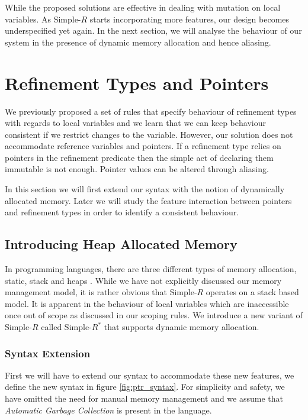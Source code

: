 \documentclass[a4paper,12pt]{report}
\begin{document}
\par
While the proposed solutions are effective in dealing with mutation on local 
variables. As Simple-$R$ starts incorporating more features, our design becomes 
underspecified yet again. In the next section, we will analyse 
the behaviour of our system in the presence of dynamic memory allocation 
and hence aliasing.

\section{Refinement Types and Pointers}
We previously proposed a set of rules that specify behaviour of refinement 
types with regards to local variables and we learn that we can keep behaviour 
consistent if we restrict changes to the variable. However, our solution does 
not accommodate reference variables and pointers. If a refinement type 
relies on pointers in the refinement predicate then the simple act of declaring 
them immutable is not enough. Pointer values can be altered through aliasing. 

\par
In this section we will first extend our syntax with the notion of dynamically 
allocated memory. Later we will study the feature interaction between 
pointers and refinement types in order to identify a consistent behaviour. 

\subsection{Introducing Heap Allocated Memory}
In programming languages, there are three different types of memory allocation, 
static, stack and heaps \cite{heapVsStack}. While we have not explicitly 
discussed our memory management model, it is rather obvious that Simple-$R$ 
operates on a stack based model. It is apparent in the behaviour of local 
variables which are inaccessible once out of scope as discussed in our scoping rules. 
We introduce a new variant of Simple-$R$ called Simple-$R^{*}$ that supports 
dynamic memory allocation.

\subsubsection{Syntax Extension}
First we will have to extend our syntax to accommodate these new features, we define 
the new syntax in figure \ref{fig:ptr_syntax}. For simplicity and safety, 
we have omitted the need for manual memory management and we 
assume that \textit{Automatic Garbage Collection} \cite{GC} is present in 
the language. 
\end{document}
